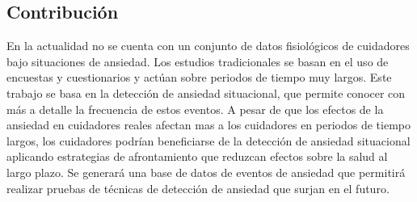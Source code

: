 \subsection{Contribuci\'on}
En la actualidad no se cuenta con un conjunto de datos fisiol\'ogicos de cuidadores bajo situaciones de ansiedad. Los estudios tradicionales se basan en el uso de encuestas y cuestionarios y actúan sobre periodos de tiempo muy largos. Este trabajo se basa en la detecci\'on de ansiedad situacional, que permite conocer con m\'as a detalle la frecuencia de estos eventos. A pesar de que los efectos de la ansiedad en cuidadores reales afectan mas a los cuidadores en periodos de tiempo largos, los cuidadores podr\'ian beneficiarse de la detecci\'on de ansiedad situacional aplicando estrategias de afrontamiento que reduzcan efectos sobre la salud al largo plazo. Se generar\'a una base de datos de eventos de ansiedad que permitir\'a realizar pruebas de t\'ecnicas de detecci\'on de ansiedad que surjan en el futuro.


	
